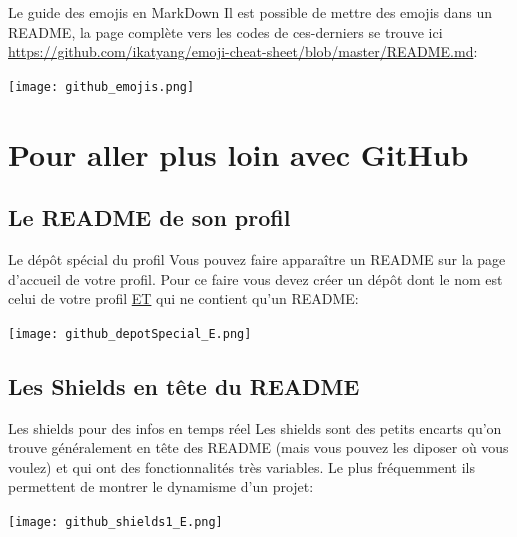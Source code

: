 \documentclass{beamer}
\begin{document}
\begin{frame}{Le guide des emojis en MarkDown}
Il est possible de mettre des emojis dans un README, la page complète vers les codes de ces-derniers se trouve ici \url{https://github.com/ikatyang/emoji-cheat-sheet/blob/master/README.md}: 
\begin{center}
	\texttt{[image: github\_emojis.png]}
\end{center}
\end{frame}




\section{Pour aller plus loin avec GitHub}

\subsection{Le README de son profil}
\begin{frame}{Le dépôt spécial du profil}
Vous pouvez faire apparaître un README sur la page d'accueil de votre profil. Pour ce faire vous devez créer un dépôt dont le nom est celui de votre profil \underline{ET} qui ne contient qu'un README:
\begin{center}
	\texttt{[image: github\_depotSpecial\_E.png]}
\end{center}
\end{frame}


\subsection{Les Shields en tête du README}
\begin{frame}{Les shields pour des infos en temps réel}
Les shields sont des petits encarts qu'on trouve généralement en tête des README (mais vous pouvez les diposer où vous voulez) et qui ont des fonctionnalités très variables. Le plus fréquemment ils permettent de montrer le dynamisme d'un projet:
\begin{center}
	\texttt{[image: github\_shields1\_E.png]}
\end{center}
\end{frame}
\end{document}
